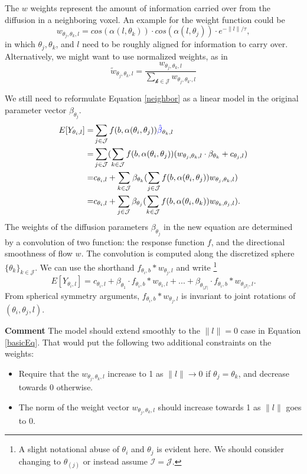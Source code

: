 \documentclass[11pt]{amsart}
\newcommand{\tj}{\theta_j}
\newcommand{\ti}{\theta_i}
\newcommand{\tk}{\theta_k}
\newcommand{\ytil}{Y_{\theta_i,l}}
\begin{document}
The $w$ weights represent the amount of information carried over from the diffusion in a neighboring voxel. 
An example for the weight function could be
\[ w_{\tj,\tk, l}  = cos(\alpha(l,\tk)) \cdot cos(\alpha(l, \tj)) \cdot e^{-\|l\|/\tau}, \]
in which $\tj, \tk$, and $l$ need to be roughly aligned for information to carry over. 
Alternatively, we might want to use normalized weights, as in 
\[\tilde{w}_{\tj,\tk, l}  = \frac{w_{\tj,\tk, l}}{\sum_\mathcal{k \in \mathcal{J}} w_{\tj,\theta_{k'}, l}} \]

We still need to reformulate Equation \eqref{neighbor} as a linear model in the original parameter vector $\beta_{\tj}$.
\begin{eqnarray*}
E[\ytil] = & \sum_{j \in \mathcal{J}}  f(b, \alpha(\ti, \tj)) \textcolor{blue}{\hat{\beta}}_{\tk,l} \\
 = & \sum_{j \in \mathcal{J}} ( \sum_{k\in\mathcal{J}} f(b, \alpha(\ti, \tj)) ( w_{\tj,\tk, l} \cdot \beta_{\tk} + c_{\tj,l})\\
 = & c_{\ti,l} +  \sum_{k\in\mathcal{J}}  \beta_{\tk}  (\sum_{j \in \mathcal{J}}  f(b, \alpha(\ti, \tj))  w_{\tj,\tk, l})\\
  = & c_{\ti,l} +  \sum_{j\in\mathcal{J}}  \beta_{\tj}  (\sum_{k\in \mathcal{J}}  f(b, \alpha(\ti, \tk))  w_{\tk,\tj, l}).
\end{eqnarray*}   
The weights of the diffusion parameters $\beta_{\tj}$ in the new equation are determined by a convolution of two function: 
the response function $f$, and the directional smoothness of flow $w$. 
The convolution is computed along the discretized sphere $\{\tk\}_{k \in \mathcal{J}}$. 
We can use the shorthand $f_{\ti,b}* w_{\tj,l}$ and write
\footnote{A slight notational abuse of $\ti$ and $\tj$ is evident here. We should consider changing to $\theta_{(j)}$ or instead assume $\mathcal{I}=\mathcal{J}$.} 
\begin{equation}
E[\ytil]  = c_{\ti,l} +  \beta_{\theta_1} \cdot f_{\ti,b}* w_{\theta_1,l}+ ... +\beta_{\theta_{|\mathcal{J}|}} \cdot f_{\ti,b}* w_{\theta_{|\mathcal{J}|},l}.
\end{equation}
From spherical symmetry arguments, $f_{\ti,b}*w_{\tj,l}$ is invariant to joint rotations of $(\ti,\tj, l)$.

\textbf{Comment} The model should extend smoothly to the $\| l\| = 0$ case in Equation \eqref{basicEq}. 
That would put the following two additional constraints on the weights: 
\begin{itemize}
\item Require that the $w_{\tj,\tk,l}$ increase to 1 as $\|l\| \to 0$ if $\tj=\tk$, and decrease towards 0 otherwise.
\item The norm of the weight vector $w_{\tj,\tk,l}$ should increase towards 1 as $\|l\|$ goes to 0. 
\end{itemize}
\end{document}
